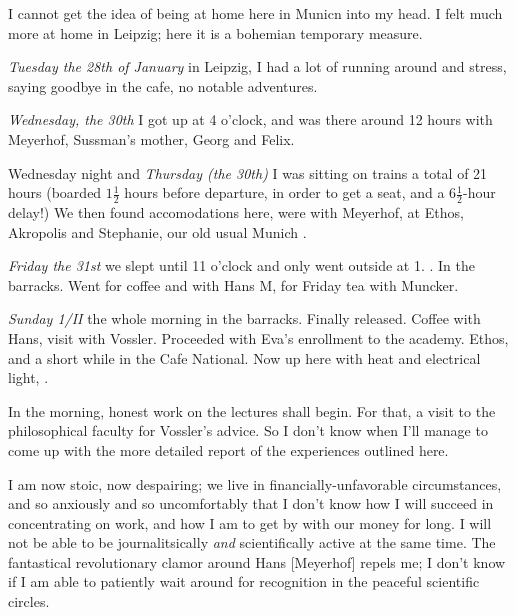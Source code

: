 
I cannot get the idea of being at home here in Municn into my head. I felt much more at home in Leipzig; here it is a bohemian temporary measure.

\textit{Tuesday the 28th of January} in Leipzig, I had a lot of running around and stress, saying goodbye in the cafe, no notable adventures.

\textit{Wednesday, the 30th} I got up at 4 o'clock,  and was there around 12 hours with Meyerhof, Sussman's mother, Georg and Felix.

Wednesday night and \textit{Thursday (the 30th)} I was sitting on trains a total of 21 hours (boarded $1\frac{1}{2}$ hours before departure, in order to get a seat, and a $6\frac{1}{2}$-hour delay!) We then found accomodations here, were with Meyerhof, at Ethos, Akropolis and Stephanie, our old usual Munich .

\textit{Friday the 31st} we slept until 11 o'clock and only went outside at 1. . In the barracks. Went for coffee and  with Hans M, for Friday tea with Muncker.

\textit{Sunday 1/II} the whole morning in the barracks. Finally released. Coffee with Hans, visit with Vossler. Proceeded with Eva's enrollment to the academy. Ethos, and a short while in the Cafe National. Now up here with heat and electrical light, .

In the morning, honest work on the lectures shall begin. For that, a visit to the philosophical faculty for Vossler's advice. So I don't know when I'll manage to come up with the more detailed report of the experiences outlined here.

I am now stoic, now despairing; we live in financially-unfavorable circumstances, and so anxiously and so uncomfortably that I don't know how I will succeed in concentrating on work, and how I am to get by with our money for long. I will not be able to be journalitsically \textit{and} scientifically active at the same time. The fantastical revolutionary clamor around Hans [Meyerhof] repels me; I don't know if I am able to patiently wait around for recognition in the peaceful scientific circles.
